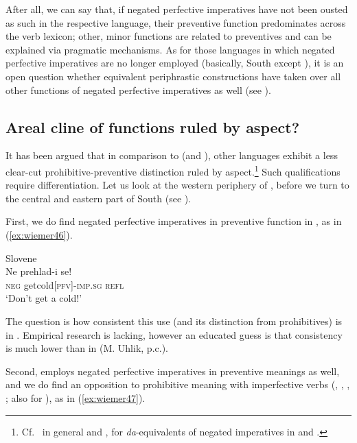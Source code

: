 \documentclass[output=paper,colorlinks,citecolor=brown]{langscibook}
\begin{document}
After all, we can say that, if negated perfective imperatives have not been ousted as such in the respective  language, their preventive function predominates across the verb lexicon; other, minor functions are related to preventives and can be explained via pragmatic mechanisms. As for those  languages in which negated perfective imperatives are no longer employed (basically, South  except ), it is an open question whether equivalent periphrastic constructions have taken over all other functions of negated perfective imperatives as well (see ).







\subsection{Areal cline of functions ruled by aspect?}
\label{subsec:areal}


It has been argued that in comparison to  (and ), other  languages exhibit a less clear-cut prohibitive-preventive distinction ruled by aspect.\footnote{Cf.\ \citet[96]{Nilsson2013} in general and \citet[156]{Ivanova2014}, \citet{MitkovskaEtAl2017} for \textit{da}-equivalents of negated imperatives in  and .} Such qualifications require differentiation. Let us look at the western periphery of , before we turn to the central and eastern part of South  (see ).


First, we do find negated perfective imperatives in preventive function in , as in (\ref{ex:wiemer46}).


\ea \textnormal{Slovene} \\
\label{ex:wiemer46} 
\gll Ne prehlad-i se! \\
\textsc{neg} get\textunderscore cold\textsc{[pfv]-imp.sg} \textsc{refl} \\
\glt `Don't get a cold!'
\z



\noindent The question is how consistent this use (and its distinction from prohibitives) is in . Empirical research is lacking, however an educated guess is that consistency is much lower than in  (M. Uhlik, p.c.).

Second,  employs negated perfective imperatives in preventive meanings as well, and we do find an opposition to prohibitive meaning with imperfective verbs (\citealt[322]{Trávníček1923}, \citealt[79--81]{Dokulil1948}, \citealt[60--61]{Kopečný1962}, \citealt{Kučera1984}; also \citealt[366--367]{Meyer2010} for ), as in (\ref{ex:wiemer47}).
\end{document}
